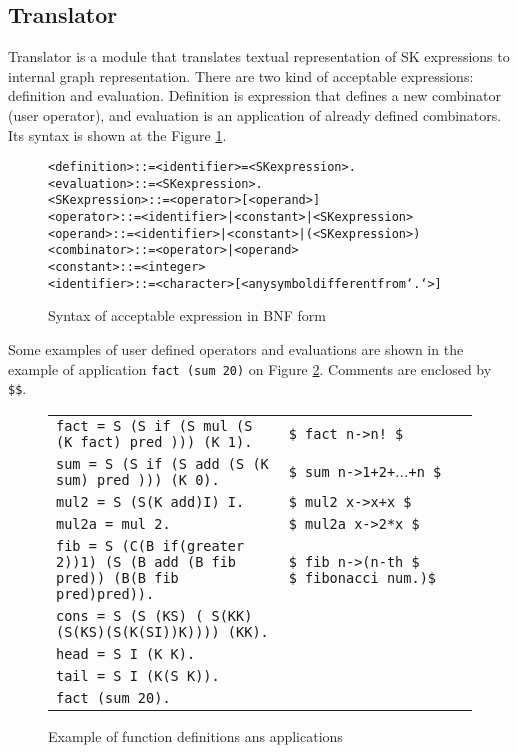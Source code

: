 \documentclass{article}
\begin{document}
\subsection{Translator}
Translator is a module that translates textual representation of
SK expressions to internal graph representation. There are two kind
of acceptable expressions: definition and evaluation. Definition
is expression that defines a new combinator (user operator), and
evaluation is an application of already defined combinators. Its syntax
is shown at the Figure \ref{fig:syntax}.
\begin{figure}[h]
\begin{alltt}
<definition>   ::= <identifier> = <SKexpression>.
<evaluation>   ::= <SKexpression>.
<SKexpression> ::= <operator> [<operand>]
<operator>     ::= <identifier> | <constant> | <SKexpression>
<operand>      ::= <identifier> | <constant> | (<SKexpression>)
<combinator>   ::= <operator>   | <operand>
<constant>     ::= <integer>
<identifier>   ::= <character> [<any symbol different from `.`>]
\end{alltt}
\caption{Syntax of acceptable expression in BNF form}
\label{fig:syntax}
\end{figure}
Some examples of user defined operators and evaluations are shown in the
example of application {\tt fact (sum 20)} on Figure \ref{fig:exampl}.
Comments are enclosed by {\tt\$\$}.
\begin{figure}[h]
\begin{tabularx}{\linewidth}
{>{\setlength{\hsize}{1.44\hsize}\tt}X
 >{\setlength{\hsize}{0.56\hsize}\tt}X}
fact = S (S if (S mul (S (K fact) pred ))) (K 1).
&\$ fact n->n! \$\\
sum = S (S if (S add (S (K sum) pred ))) (K 0).
&\$ sum n->1+2+$\ldots$+n \$\\
mul2 = S (S(K add)I) I. &\$ mul2 x->x+x \$\\
mul2a = mul 2.  &\$ mul2a x->2*x \$\\
fib = S (C(B if(greater 2))1) (S (B add (B fib pred))
(B(B fib pred)pred)). &\$ fib n->(n-th \$ \mbox{\$ fibonacci num.)\$}\\
cons = S (S (KS) ( S(KK) (S(KS)(S(K(SI))K)))) (KK). &\\
head = S I (K K). &\\%
tail = S I (K(S K)).& \\%
fact (sum 20).& \\
\end{tabularx}
\caption{Example of function definitions ans applications}
\label{fig:exampl}
\end{figure}
\end{document}
